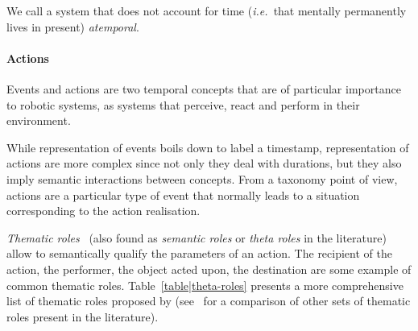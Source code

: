 \documentclass[a4paper, twocolumn]{article}
\newcommand{\ie}{{\textit{i.e.\ }}}
\begin{document}
We call a system that does not account for time (\ie that mentally permanently
lives in present) \emph{atemporal}.


\paragraph{Actions}

Events and actions are two temporal concepts that are of particular importance to
robotic systems, as systems that perceive, react and perform in their environment.

While representation of events boils down to label a timestamp, representation
of actions are more complex since not only they deal with durations, but they
also imply semantic interactions between concepts. From a taxonomy point of
view, actions are a particular type of event that normally leads to a situation
corresponding to the action realisation.


\emph{Thematic roles}~\cite{Gruber1965} (also found as \emph{semantic roles} or
\emph{theta roles} in the literature) allow to semantically qualify the
parameters of an action. The recipient of the action, the performer, the object
acted upon, the destination are some example of common thematic roles.
Table~\ref{table|theta-roles} presents a more comprehensive list of thematic
roles proposed by \cite{Aarts1997} (see~\cite{Gutierrez2001} for a comparison
of other sets of thematic roles present in the literature).
\end{document}
